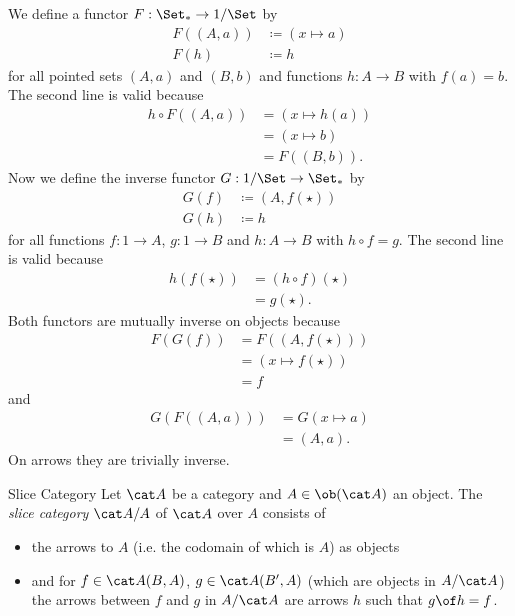\begin{answer}
  We define a functor $F : \Set_* \to 1/\Set$ by
  \begin{align*}
    F((A, a)) &\coloneqq (x \mapsto a) \\
    F(h) &\coloneqq h
  \end{align*}
  for all pointed sets $(A, a)$ and $(B, b)$ and functions $h : A \to B$ with $f(a) = b$.
  The second line is valid because
  \[ \begin{split}
    h \circ F((A, a))
    &= (x \mapsto h(a)) \\
    &= (x \mapsto b) \\
    &= F((B, b)).
  \end{split} \]
  Now we define the inverse functor $G : 1/\Set \to \Set_*$ by
  \begin{align*}
    G(f) &\coloneqq (A, f(\star)) \\
    G(h) &\coloneqq h
  \end{align*}
  for all functions $f : 1 \to A$, $g : 1 \to B$ and $h : A \to B$ with $h \circ f = g$.
  The second line is valid because
  \[ \begin{split}
    h(f(\star))
    &= (h \circ f)(\star) \\
    &= g(\star).
  \end{split} \]
  Both functors are mutually inverse on objects because
  \[ \begin{split}
    F(G(f))
    &= F((A, f(\star))) \\
    &= (x \mapsto f(\star)) \\
    &= f
  \end{split} \]
  and
  \[ \begin{split}
    G(F((A, a)))
    &= G(x \mapsto a) \\
    &= (A, a).
  \end{split} \]
  On arrows they are trivially inverse.
\end{answer}

\begin{definition}{Slice Category}
  Let $\A$ be a category and $A\in\ob(\A)$ an object. The \emph{slice category} $\A/A$ of $\A$ over $A$ consists of
  \begin{itemize}
  \item the arrows to $A$ (i.e. the codomain of which is $A$) as objects
  \item and for $f\in \A(B,A)$, $g\in\A(B',A)$ (which are objects in $A/\A$) the arrows between $f$ and $g$ in $A/\A$ are arrows $h$ such that $g\of h=f$.
  \end{itemize}
\end{definition}


